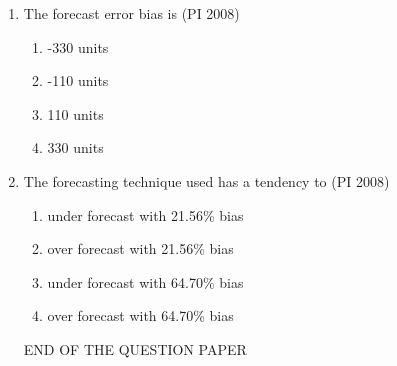 \documentclass[journal,12pt,onecolumn]{IEEEtran}
\theoremstyle{remark}
\begin{document}
\begin{enumerate}
\textbf{Statement for Linked Answer Questions 84 and 85:}

A company forecasts the demand for a product to be 400 units per month for each of the next three months. The actual demand, however, turned out to be 400, 550 and 580 units respectively for those three months.


    \item %
    The forecast error bias is \hfill{(PI 2008)} 
    \begin{enumerate}
        \item -330 units
        \item -110 units
        \item 110 units
        \item 330 units
    \end{enumerate}

    \item %
    The forecasting technique used has a tendency to \hfill{(PI 2008)} 
    \begin{enumerate}
        \item under forecast with 21.56\% bias
        \item over forecast with 21.56\% bias
        \item under forecast with 64.70\% bias
        \item over forecast with 64.70\% bias
    \end{enumerate}
\vspace{6cm}
{END OF THE QUESTION PAPER}


























    




    
    \end{enumerate}
\end{document}
